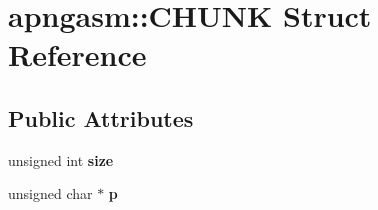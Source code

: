 \hypertarget{structapngasm_1_1CHUNK}{\section{apngasm\-:\-:C\-H\-U\-N\-K Struct Reference}
\label{structapngasm_1_1CHUNK}
}
\subsection*{Public Attributes}
\begin{DoxyCompactItemize}
\item 
\hypertarget{structapngasm_1_1CHUNK_af1da42b9b7324b266a3163f402addcf4}{unsigned int {\bfseries size}}\label{structapngasm_1_1CHUNK_af1da42b9b7324b266a3163f402addcf4}

\item 
\hypertarget{structapngasm_1_1CHUNK_ab962d21ee5701a9dd1bafbdf30242882}{unsigned char $\ast$ {\bfseries p}}\label{structapngasm_1_1CHUNK_ab962d21ee5701a9dd1bafbdf30242882}

\end{DoxyCompactItemize}
